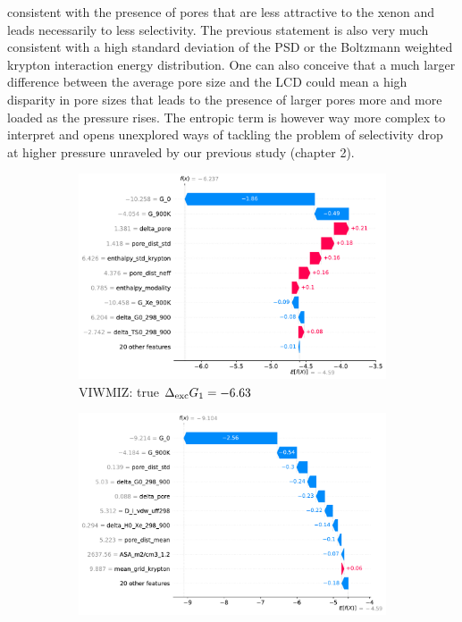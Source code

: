 \documentclass[main]{subfiles}
\begin{document}
consistent with the presence of pores that are less attractive to the xenon and leads necessarily to less selectivity. The previous statement is also very much consistent with a high standard deviation of the PSD or the Boltzmann weighted krypton interaction energy distribution. One can also conceive that a much larger difference between the average pore size and the LCD could mean a high disparity in pore sizes that leads to the presence of larger pores more and more loaded as the pressure rises.
The entropic term is however way more complex to interpret and opens unexplored ways of tackling the problem of selectivity drop at higher pressure unraveled by our previous study (chapter 2).

\begin{figure}[ht]
    \centering
    \begin{subfigure}[b]{0.47\textwidth}
      \centering
      \includegraphics[width=\textwidth]{figures/4-ml/main/VIWMIZ_clean.pdf}
      \caption{VIWMIZ: true $\Delta_{\text{exc}} G_1=-6.63$}
    \end{subfigure}
         \hfill
    \begin{subfigure}[b]{0.47\textwidth}
      \centering
      \includegraphics[width=\textwidth]{figures/4-ml/main/BIMDIL_clean.pdf}

\end{subfigure}
\end{figure}
\end{document}
